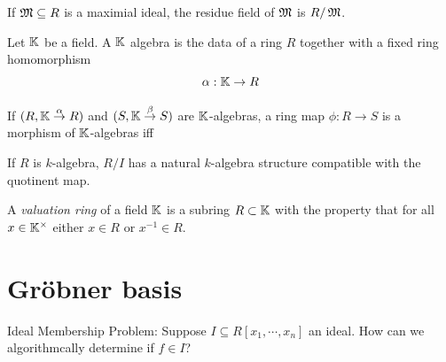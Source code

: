 \documentclass[12pt]{amsart}
\begin{document}
\begin{definition}
    If $\operatorname{\mathfrak{M}}\subseteq R$ is a maximial ideal, the residue field of $\operatorname{\mathfrak{M}}$ is $R/\operatorname{\mathfrak{M}}$.
\end{definition}

\begin{definition}
    Let $\mathbb K$ be a field. A $\mathbb K$ algebra is the data of a ring $R$ together with a fixed ring homomorphism 
    \[\alpha: \mathbb K \to R\]
\end{definition}

\begin{definition}
    If $(R, \mathbb K \overset{\alpha}{\to} R)$ and $(S, \mathbb K \overset{\beta}{\to} S)$ are $\mathbb K$-algebras, a ring map $\phi: R \to S$ is a morphism of $\mathbb K$-algebras iff

    \begin{center}
    \end{center}
\end{definition}

\begin{lemmact}
    If $R$ is $k$-algebra, $R/I$ has a natural $k$-algebra structure compatible with the quotinent map. 
        \begin{center}
        \end{center}
\end{lemmact}

\begin{definition}
    A \emph{valuation ring} of a field $\mathbb K$ is a subring $R \subset \mathbb K$ with the property that for all $x \in \mathbb K^{\times}$ either $x \in R$ or $x^{-1} \in R$. 
\end{definition}

\section{Gr\"{o}bner basis}
\begin{remark}
    Ideal Membership Problem: Suppose $I \subseteq R[x_1, \cdots, x_n]$ an ideal. How can we algorithmcally determine if $f \in I$?
\end{remark}
\end{document}
